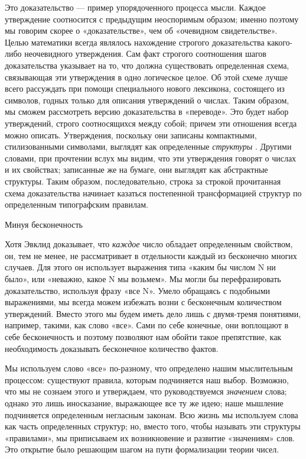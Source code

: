 Это доказательство --- пример упорядоченного процесса мысли. Каждое утверждение соотносится с предыдущим неоспоримым образом; именно поэтому мы говорим скорее о «доказательстве», чем об «очевидном свидетельстве». Целью математики всегда являлось нахождение строгого доказательства какого-либо неочевидного утверждения. Сам факт строгого соотношения шагов доказательства указывает на то, что должна существовать определенная схема, связывающая эти утверждения в одно логическое целое. Об этой схеме лучше всего рассуждать при помощи специального нового лексикона, состоящего из символов, годных только для описания утверждений о числах. Таким образом, мы сможем рассмотреть версию доказательства в «переводе». Это будет набор утверждений, строго соотносящихся между собой; причем эти отношения всегда можно описать. Утверждения, поскольку они записаны компактными, стилизованными символами, выглядят как определенные \emph{структуры} . Другими словами, при прочтении вслух мы видим, что эти утверждения говорят о числах и их свойствах; записанные же на бумаге, они выглядят как абстрактные структуры. Таким образом, последовательно, строка за строкой прочитанная схема доказательства начинает казаться постепенной трансформацией структур по определенным типографским правилам.

Минуя бесконечность

Хотя Эвклид доказывает, что \emph{каждое} число обладает определенным свойством, он, тем не менее, не рассматривает в отдельности каждый из бесконечно многих случаев. Для этого он использует выражения типа «каким бы числом N ни было», или «неважно, какое N мы возьмем». Мы могли бы перефразировать доказательство, используя фразу «все N». Умело обращаясь с подобными выражениями, мы всегда можем избежать возни с бесконечным количеством утверждений. Вместо этого мы будем иметь дело лишь с двумя-тремя понятиями, например, такими, как слово «все». Сами по себе конечные, они воплощают в себе бесконечность и поэтому позволяют нам обойти такое препятствие, как необходимость доказывать бесконечное количество фактов.

Мы используем слово «все» по-разному, что определено нашим мыслительным процессом: существуют правила, которым подчиняется наш выбор. Возможно, что мы не сознаем этого и утверждаем, что руководствуемся \emph{значением} слова; однако это лишь иносказание, выражающее все ту же идею; наше мышление подчиняется определенным негласным законам. Всю жизнь мы используем слова как часть определенных структур; но, вместо того, чтобы называть эти структуры «правилами», мы приписываем их возникновение и развитие «значениям» слов. Это открытие было решающим шагом на пути формализации теории чисел.

